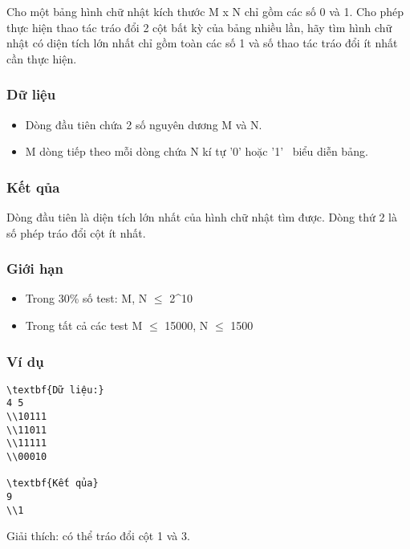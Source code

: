



   Cho một bảng hình chữ nhật kích thước M x N chỉ gồm các số 0 và 1. Cho phép thực hiện thao tác tráo đổi 2 cột bất kỳ của bảng nhiều lần, hãy tìm hình chữ nhật có diện tích lớn nhất chỉ gồm toàn các số 1 và số thao tác tráo đổi ít nhất cần thực hiện.  

\subsubsection{   Dữ liệu  }
\begin{itemize}
	\item     Dòng đầu tiên chứa 2 số nguyên dương M và N.   
	\item     M dòng tiếp theo mỗi dòng chứa N kí tự '0' hoặc '1'  biểu diễn bảng.   
\end{itemize}

\subsubsection{   Kết qủa  }

   Dòng đầu tiên là diện tích lớn nhất của hình chữ nhật tìm được. Dòng thứ 2 là số phép tráo đổi cột ít nhất.  

\subsubsection{   Giới hạn  }
\begin{itemize}
	\item     Trong 30\% số test: M, N  $\le$  2^10   
	\item     Trong tất cả các test M  $\le$  15000, N  $\le$  1500   
\end{itemize}

\subsubsection{   Ví dụ  }
\begin{verbatim}
\textbf{Dữ liệu:}
4 5
\\10111
\\11011
\\11111
\\00010

\textbf{Kết qủa}
9
\\1
\end{verbatim}

   Giải thích: có thể tráo đổi cột 1 và 3.  
